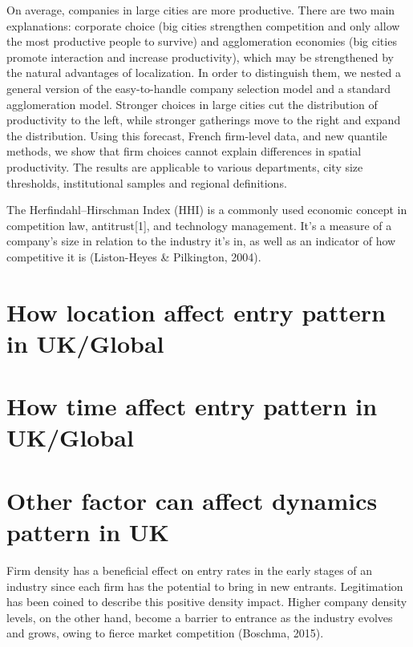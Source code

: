 \documentclass[
  12pt,
  oneside]{book}
\begin{document}
On average, companies in large cities are more productive. There are two main explanations: corporate choice (big cities strengthen competition and only allow the most productive people to survive) and agglomeration economies (big cities promote interaction and increase productivity), which may be strengthened by the natural advantages of localization. In order to distinguish them, we nested a general version of the easy-to-handle company selection model and a standard agglomeration model. Stronger choices in large cities cut the distribution of productivity to the left, while stronger gatherings move to the right and expand the distribution. Using this forecast, French firm-level data, and new quantile methods, we show that firm choices cannot explain differences in spatial productivity. The results are applicable to various departments, city size thresholds, institutional samples and regional definitions.

The Herfindahl--Hirschman Index (HHI) is a commonly used economic concept in competition law, antitrust{[}1{]}, and technology management. It's a measure of a company's size in relation to the industry it's in, as well as an indicator of how competitive it is \hspace{0pt}(Liston-Heyes \& Pilkington, 2004).

\hypertarget{how-location-affect-entry-pattern-in-ukglobal}{%
\section{How location affect entry pattern in UK/Global}\label{how-location-affect-entry-pattern-in-ukglobal}}

\hypertarget{how-time-affect-entry-pattern-in-ukglobal}{%
\section{How time affect entry pattern in UK/Global}\label{how-time-affect-entry-pattern-in-ukglobal}}

\hypertarget{other-factor-can-affect-dynamics-pattern-in-uk}{%
\section{Other factor can affect dynamics pattern in UK}\label{other-factor-can-affect-dynamics-pattern-in-uk}}

Firm density has a beneficial effect on entry rates in the early stages of an industry since each firm has the potential to bring in new entrants. Legitimation has been coined to describe this positive density impact. Higher company density levels, on the other hand, become a barrier to entrance as the industry evolves and grows, owing to fierce market competition (Boschma, 2015).
\end{document}
